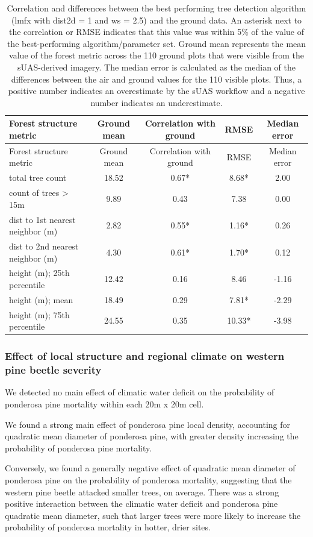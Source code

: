 \documentclass[]{article}
\begin{document}
\begin{longtable}[]{@{}lcccc@{}}
\caption{Correlation and differences between the best performing tree
detection algorithm (lmfx with dist2d = 1 and ws = 2.5) and the ground
data. An asterisk next to the correlation or RMSE indicates that this
value was within 5\% of the value of the best-performing
algorithm/parameter set. Ground mean represents the mean value of the
forest metric across the 110 ground plots that were visible from the
sUAS-derived imagery. The median error is calculated as the median of
the differences between the air and ground values for the 110 visible
plots. Thus, a positive number indicates an overestimate by the sUAS
workflow and a negative number indicates an
underestimate.}\tabularnewline
\toprule
Forest structure metric & Ground mean & Correlation with ground & RMSE &
Median error\tabularnewline
\midrule
\endfirsthead
\toprule
Forest structure metric & Ground mean & Correlation with ground & RMSE &
Median error\tabularnewline
\midrule
\endhead
total tree count & 18.52 & 0.67* & 8.68* & 2.00\tabularnewline
count of trees \textgreater{} 15m & 9.89 & 0.43 & 7.38 &
0.00\tabularnewline
dist to 1st nearest neighbor (m) & 2.82 & 0.55* & 1.16* &
0.26\tabularnewline
dist to 2nd nearest neighbor (m) & 4.30 & 0.61* & 1.70* &
0.12\tabularnewline
height (m); 25th percentile & 12.42 & 0.16 & 8.46 & -1.16\tabularnewline
height (m); mean & 18.49 & 0.29 & 7.81* & -2.29\tabularnewline
height (m); 75th percentile & 24.55 & 0.35 & 10.33* &
-3.98\tabularnewline
\bottomrule
\end{longtable}

\subsubsection{Effect of local structure and regional climate on western
pine beetle
severity}\label{effect-of-local-structure-and-regional-climate-on-western-pine-beetle-severity}

We detected no main effect of climatic water deficit on the probability
of ponderosa pine mortality within each 20m x 20m cell.

We found a strong main effect of ponderosa pine local density,
accounting for quadratic mean diameter of ponderosa pine, with greater
density increasing the probability of ponderosa pine mortality.

Conversely, we found a generally negative effect of quadratic mean
diameter of ponderosa pine on the probability of ponderosa mortality,
suggesting that the western pine beetle attacked smaller trees, on
average. There was a strong positive interaction between the climatic
water deficit and ponderosa pine quadratic mean diameter, such that
larger trees were more likely to increase the probability of ponderosa
mortality in hotter, drier sites.
\end{document}
